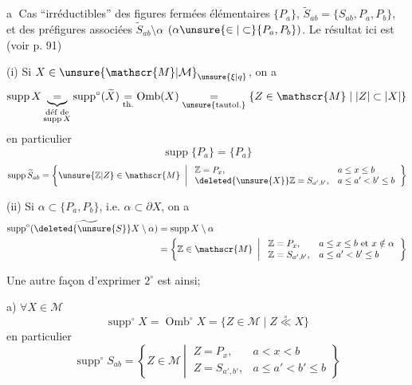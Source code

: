
\textcircled{a} Cas ``irréductibles'' des figures fermées élémentaires $\{P_a\}$, $\widetilde S_{ab}=\{S_{ab},P_a,P_b\}$, et des préfigures associées $\widetilde S_{ab}\setminus\alpha$ $(\alpha\unsure{\in|\subset}\{P_a,P_b\})$.
Le résultat ici est (voir p. 91)

(i) Si $X\in\unsure{\mathscr{M}|\mathcal{M}}_{\unsure{\xi|q}}$, on a
\[
\operatorname{supp}X\underbrace{=}_{\substack{\text{déf de}\\\operatorname{supp}X}}\operatorname{supp}^{\circ}(\widetilde X)
\underset{\text{th.}}{=}\operatorname{Omb}(X)
\underset{\text{\unsure{tautol.}}}{=}\{Z\in\mathscr{M}\mid |Z|\subset|X|\}
\]
en particulier
\[
\operatorname{supp}\{P_a\}=\{P_a\}
\]
\[
\operatorname{supp}\widetilde S_{ab}=\left\{\unsure{\mathbb{Z}|Z}\in\mathscr{M}\ \left|\
\begin{array}{ll}
\mathbb{Z}=P_x,&a\leq x\leq b\\
\deleted{\unsure{X}}\mathbb{Z}=S_{a',b'},&a\leq a'<b'\leq b
\end{array}\right.\right\}
\]

(ii) Si  $\alpha\subset\{P_a,P_b\}$, i.e. $\alpha\subset\partial X$, on a
\[
\begin{aligned}
\operatorname{supp}^{\circ}(\widetilde{\deleted{\unsure{S}}X}\setminus\alpha)&=\operatorname{supp}X\setminus\alpha\\
&=\left\{\mathbb{Z}\in\mathscr{M}\ \left|\
\begin{array}{ll}
\mathbb{Z}=P_x,&a\leq x\leq b\text{ et }x\notin\alpha\\
\mathbb{Z}=S_{a',b'},&a\leq a'<b'\leq b
\end{array}\right.\right\}
\end{aligned}
\]

Une autre façon  d'exprimer $2^{\circ}$ est ainsi; 

a) $\forall X\in\mathscr{M}$
\[
\operatorname{supp}^{\circ}X=\operatorname{Omb}^{\circ}X=\{Z\in\mathscr{M}\mid Z\overset{\circ}{\ll}X\}
\]
en particulier
\[
\operatorname{supp}^{\circ}S_{ab}=\left\{Z\in\mathscr{M}\ \left|\
\begin{array}{ll}
Z=P_x,&a<x<b\\
Z=S_{a',b'},&a\leq a'<b'\leq b
\end{array}\right.\right\}
\]

